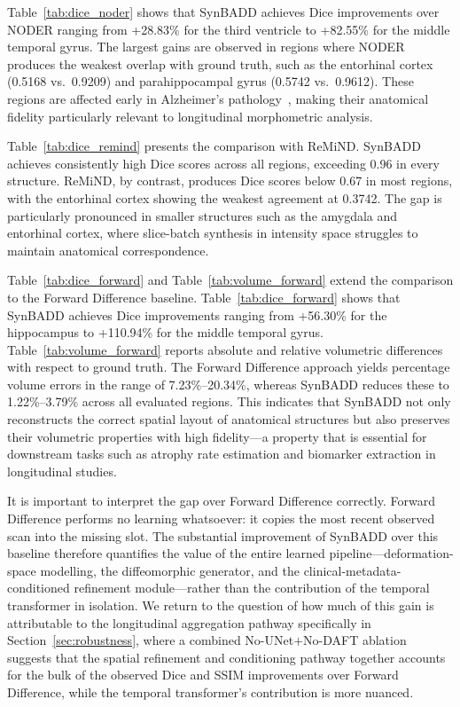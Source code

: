 Table~\ref{tab:dice_noder} shows that SynBADD achieves Dice improvements over NODER ranging from +28.83\% for the third ventricle to +82.55\% for the middle temporal gyrus. The largest gains are observed in regions where NODER produces the weakest overlap with ground truth, such as the entorhinal cortex (0.5168 vs.\ 0.9209) and parahippocampal gyrus (0.5742 vs.\ 0.9612). These regions are affected early in Alzheimer's pathology~\cite{braak1991neuropathological,barnes2009atrophy}, making their anatomical fidelity particularly relevant to longitudinal morphometric analysis.

Table~\ref{tab:dice_remind} presents the comparison with ReMiND. SynBADD achieves consistently high Dice scores across all regions, exceeding 0.96 in every structure. ReMiND, by contrast, produces Dice scores below 0.67 in most regions, with the entorhinal cortex showing the weakest agreement at 0.3742. The gap is particularly pronounced in smaller structures such as the amygdala and entorhinal cortex, where slice-batch synthesis in intensity space struggles to maintain anatomical correspondence.

Table~\ref{tab:dice_forward} and Table~\ref{tab:volume_forward} extend the comparison to the Forward Difference baseline. Table~\ref{tab:dice_forward} shows that SynBADD achieves Dice improvements ranging from +56.30\% for the hippocampus to +110.94\% for the middle temporal gyrus. Table~\ref{tab:volume_forward} reports absolute and relative volumetric differences with respect to ground truth. The Forward Difference approach yields percentage volume errors in the range of 7.23\%--20.34\%, whereas SynBADD reduces these to 1.22\%--3.79\% across all evaluated regions. This indicates that SynBADD not only reconstructs the correct spatial layout of anatomical structures but also preserves their volumetric properties with high fidelity---a property that is essential for downstream tasks such as atrophy rate estimation and biomarker extraction in longitudinal studies.

It is important to interpret the gap over Forward Difference correctly. Forward Difference performs no learning whatsoever: it copies the most recent observed scan into the missing slot. The substantial improvement of SynBADD over this baseline therefore quantifies the value of the entire learned pipeline---deformation-space modelling, the diffeomorphic generator, and the clinical-metadata-conditioned refinement module---rather than the contribution of the temporal transformer in isolation. We return to the question of how much of this gain is attributable to the longitudinal aggregation pathway specifically in Section~\ref{sec:robustness}, where a combined No-UNet$+$No-DAFT ablation suggests that the spatial refinement and conditioning pathway together accounts for the bulk of the observed Dice and SSIM improvements over Forward Difference, while the temporal transformer's contribution is more nuanced.

